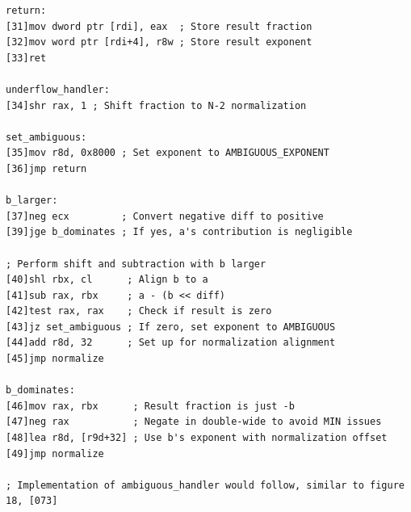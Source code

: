 \documentclass[12pt,letter]{article}
\begin{document}
\begin{lstlisting}[style=rust, caption={Assembly Implementation of Scalar Subtraction}, label={fig:scalar_subtract}]
return:
[31]mov dword ptr [rdi], eax  ; Store result fraction
[32]mov word ptr [rdi+4], r8w ; Store result exponent
[33]ret

underflow_handler:
[34]shr rax, 1 ; Shift fraction to N-2 normalization

set_ambiguous:
[35]mov r8d, 0x8000 ; Set exponent to AMBIGUOUS_EXPONENT
[36]jmp return

b_larger:
[37]neg ecx         ; Convert negative diff to positive
[39]jge b_dominates ; If yes, a's contribution is negligible

; Perform shift and subtraction with b larger
[40]shl rbx, cl      ; Align b to a
[41]sub rax, rbx     ; a - (b << diff)
[42]test rax, rax    ; Check if result is zero
[43]jz set_ambiguous ; If zero, set exponent to AMBIGUOUS
[44]add r8d, 32      ; Set up for normalization alignment
[45]jmp normalize

b_dominates:
[46]mov rax, rbx      ; Result fraction is just -b
[47]neg rax           ; Negate in double-wide to avoid MIN issues
[48]lea r8d, [r9d+32] ; Use b's exponent with normalization offset
[49]jmp normalize

; Implementation of ambiguous_handler would follow, similar to figure 18, [073]
\end{lstlisting}
\end{document}
